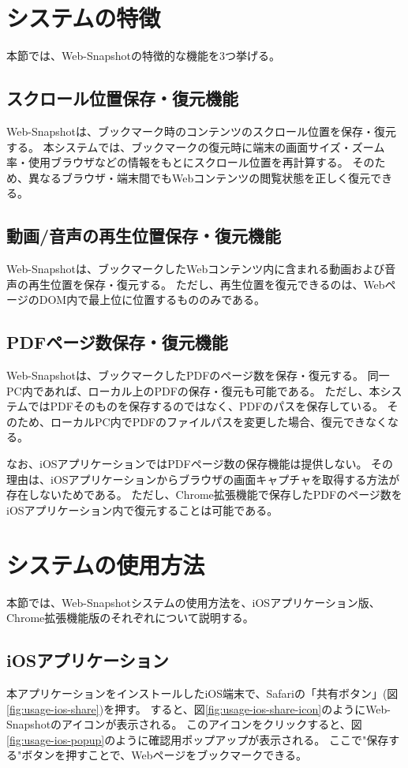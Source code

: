 \section{システムの特徴}
本節では、Web-Snapshotの特徴的な機能を3つ挙げる。

\subsection{スクロール位置保存・復元機能}
Web-Snapshotは、ブックマーク時のコンテンツのスクロール位置を保存・復元する。
本システムでは、ブックマークの復元時に端末の画面サイズ・ズーム率・使用ブラウザなどの情報をもとにスクロール位置を再計算する。
そのため、異なるブラウザ・端末間でもWebコンテンツの閲覧状態を正しく復元できる。

\subsection{動画/音声の再生位置保存・復元機能}
Web-Snapshotは、ブックマークしたWebコンテンツ内に含まれる動画および音声の再生位置を保存・復元する。
ただし、再生位置を復元できるのは、WebページのDOM内で最上位に位置するもののみである。

\subsection{PDFページ数保存・復元機能}
Web-Snapshotは、ブックマークしたPDFのページ数を保存・復元する。
同一PC内であれば、ローカル上のPDFの保存・復元も可能である。
ただし、本システムではPDFそのものを保存するのではなく、PDFのパスを保存している。
そのため、ローカルPC内でPDFのファイルパスを変更した場合、復元できなくなる。

なお、iOSアプリケーションではPDFページ数の保存機能は提供しない。
その理由は、iOSアプリケーションからブラウザの画面キャプチャを取得する方法が存在しないためである。
ただし、Chrome拡張機能で保存したPDFのページ数をiOSアプリケーション内で復元することは可能である。

\section{システムの使用方法}
本節では、Web-Snapshotシステムの使用方法を、iOSアプリケーション版、Chrome拡張機能版のそれぞれについて説明する。

\subsection{iOSアプリケーション}
本アプリケーションをインストールしたiOS端末で、Safariの「共有ボタン」(図\ref{fig:usage-ios-share})を押す。
すると、図\ref{fig:usage-ios-share-icon}のようにWeb-Snapshotのアイコンが表示される。
このアイコンをクリックすると、図\ref{fig:usage-ios-popup}のように確認用ポップアップが表示される。
ここで"保存する"ボタンを押すことで、Webページをブックマークできる。

